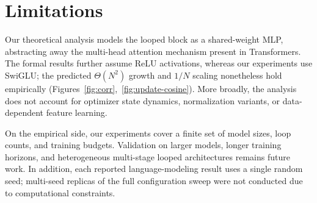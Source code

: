 \section*{Limitations}

Our theoretical analysis models the looped block as a shared-weight MLP, abstracting away the multi-head attention mechanism present in Transformers.
The formal results further assume ReLU activations, whereas our experiments use SwiGLU; the predicted $\Theta(N^2)$ growth and $1/N$ scaling nonetheless hold empirically (Figures~\ref{fig:corr},~\ref{fig:update-cosine}).
More broadly, the analysis does not account for optimizer state dynamics, normalization variants, or data-dependent feature learning.

On the empirical side, our experiments cover a finite set of model sizes, loop counts, and training budgets.
Validation on larger models, longer training horizons, and heterogeneous multi-stage looped architectures remains future work.
In addition, each reported language-modeling result uses a single random seed; multi-seed replicas of the full configuration sweep were not conducted due to computational constraints.

